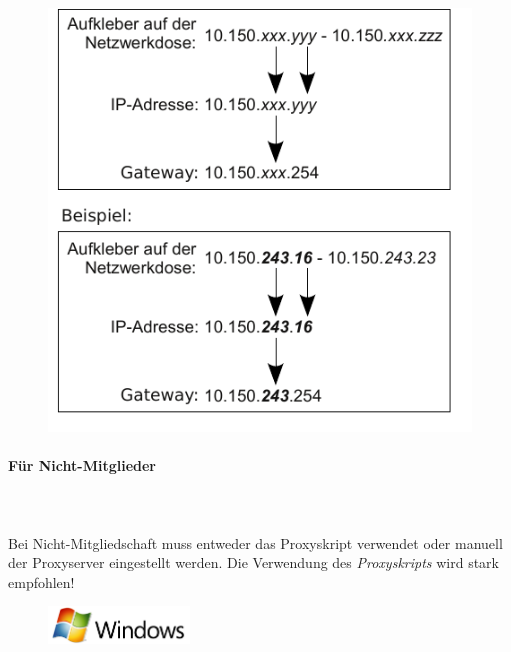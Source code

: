 \documentclass[a4paper,12pt]{scrartcl}
\begin{document}
\begin{figure}[h!]
		\centering
		\begin{minipage}[c]{0.45\linewidth}
			\centering
			\includegraphics[width=\linewidth,keepaspectratio]{Bilder/IP_Gerneric}
		\end{minipage}
	\end{figure}

\paragraph*{Für Nicht-Mitglieder}~\\
\\
Bei Nicht-Mitgliedschaft muss entweder das Proxyskript verwendet oder manuell der Proxyserver eingestellt werden. Die Verwendung des \emph{Proxyskripts} wird stark empfohlen!


\newpage
\enlargethispage{20pt}


\begin{figure}[h]
	\raggedleft
	\vspace{-20pt}
	\includegraphics[height=1cm,keepaspectratio]{Bilder/Windows_logo}
	\vspace{-30pt}
\end{figure}
\end{document}
